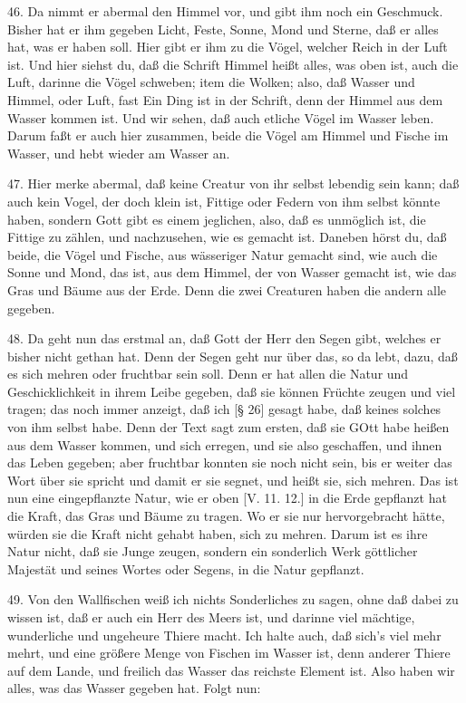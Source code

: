 46. Da nimmt er abermal den Himmel vor, und gibt ihm noch ein Geschmuck. Bisher hat er ihm gegeben Licht, Feste, Sonne, Mond und Sterne, daß er alles hat, was er haben soll. Hier gibt er ihm zu die Vögel, welcher Reich in der Luft ist. Und hier siehst du, daß die Schrift Himmel heißt alles, was oben ist, auch die Luft, darinne die Vögel schweben; item die Wolken; also, daß Wasser und Himmel, oder Luft, fast Ein Ding ist in der Schrift, denn der Himmel aus dem Wasser kommen ist. Und wir sehen, daß auch etliche Vögel im Wasser leben. Darum faßt er auch hier zusammen, beide die Vögel am Himmel und Fische im Wasser, und hebt wieder am Wasser an.

47. Hier merke abermal, daß keine Creatur von ihr selbst lebendig sein kann; daß auch kein Vogel, der doch klein ist, Fittige oder Federn von ihm selbst könnte haben, sondern Gott gibt es einem jeglichen, also, daß es unmöglich ist, die Fittige zu zählen, und nachzusehen, wie es gemacht ist. Daneben hörst du, daß beide, die Vögel und Fische, aus wässeriger Natur gemacht sind, wie auch die Sonne und Mond, das ist, aus dem Himmel, der von Wasser gemacht ist, wie das Gras und Bäume aus der Erde. Denn die zwei Creaturen haben die andern alle gegeben.

48. Da geht nun das erstmal an, daß Gott der Herr den Segen gibt, welches er bisher nicht gethan hat. Denn der Segen geht nur über das, so da lebt, dazu, daß es sich mehren oder fruchtbar sein soll. Denn er hat allen die Natur und Geschicklichkeit in ihrem Leibe gegeben, daß sie können Früchte zeugen und viel tragen; das noch immer anzeigt, daß ich [§ 26] gesagt habe,
daß keines solches von ihm selbst habe. Denn der Text sagt zum ersten, daß sie GOtt habe heißen aus dem Wasser kommen, und sich erregen, und sie also geschaffen, und ihnen das Leben gegeben; aber fruchtbar konnten sie noch nicht sein, bis er weiter das Wort über sie spricht und damit er sie segnet, und heißt sie, sich mehren. Das ist nun eine eingepflanzte Natur, wie er oben [V. 11. 12.] in die Erde gepflanzt hat die Kraft, das Gras und Bäume zu tragen. Wo er sie nur hervorgebracht hätte, würden sie die Kraft nicht gehabt haben, sich zu mehren. Darum ist es ihre Natur nicht, daß sie Junge zeugen, sondern ein sonderlich Werk göttlicher Majestät und seines Wortes oder Segens, in die Natur gepflanzt.

49. Von den Wallfischen weiß ich nichts Sonderliches zu sagen, ohne daß dabei zu wissen ist, daß er auch ein Herr des Meers ist, und darinne viel mächtige, wunderliche und ungeheure Thiere macht. Ich halte auch, daß sich's viel mehr mehrt, und eine größere Menge von Fischen im Wasser ist, denn anderer Thiere auf dem Lande, und freilich das Wasser das reichste Element ist. Also haben wir alles, was das Wasser gegeben hat. Folgt nun:

